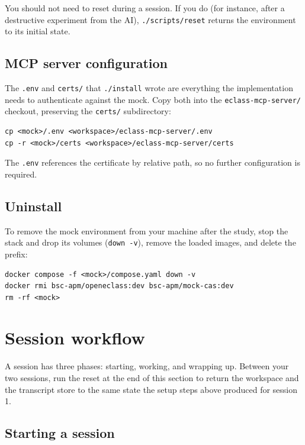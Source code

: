 \documentclass[11pt, a4paper]{article}
\begin{document}
You should not need to reset during a session. If you do (for instance, after a destructive experiment from the AI), \texttt{./scripts/reset} returns the environment to its initial state.

\subsection{MCP server configuration}
\label{sec:env:config}

The \texttt{.env} and \texttt{certs/} that \texttt{./install} wrote are everything the implementation needs to authenticate against the mock. Copy both into the \texttt{eclass-mcp-server/} checkout, preserving the \texttt{certs/} subdirectory:

\begin{verbatim}
cp <mock>/.env <workspace>/eclass-mcp-server/.env
cp -r <mock>/certs <workspace>/eclass-mcp-server/certs
\end{verbatim}

The \texttt{.env} references the certificate by relative path, so no further configuration is required.

\subsection{Uninstall}
\label{sec:env:uninstall}

To remove the mock environment from your machine after the study, stop the stack and drop its volumes (\texttt{down -v}), remove the loaded images, and delete the prefix:

\begin{verbatim}
docker compose -f <mock>/compose.yaml down -v
docker rmi bsc-apm/openeclass:dev bsc-apm/mock-cas:dev
rm -rf <mock>
\end{verbatim}

\section{Session workflow}
\label{sec:workflow}

A session has three phases: starting, working, and wrapping up. Between your two sessions, run the reset at the end of this section to return the workspace and the transcript store to the same state the setup steps above produced for session 1.

\subsection{Starting a session}
\label{sec:starting}
\end{document}
